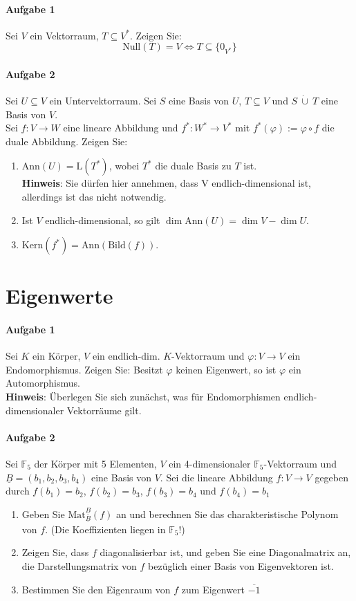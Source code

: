 \documentclass{scrartcl}
\begin{document}
	\paragraph{Aufgabe 1}
	Sei $V$ ein Vektorraum, $T\subseteq V^*$. Zeigen Sie:
	\[\text{Null}(T)=V\Leftrightarrow T\subseteq\{0_{V^*}\}\]
	\paragraph{Aufgabe 2}
	Sei $U\subseteq V$ ein Untervektorraum. Sei $S$ eine Basis von $U$, $T\subseteq V$ und $S\ \dot\cup\ T$ eine Basis von $V$.\\
	Sei $f: V\to W$ eine lineare Abbildung und $f^*: W^*\to V^*$
	mit $f^*(\varphi):=\varphi\circ f$ die duale Abbildung. Zeigen Sie:
	\begin{enumerate}[label=(\alph*)]
		\item $\text{Ann}(U)=\text{L}(T^*)$, wobei $T^*$ die duale Basis zu $T$ ist.\\
		\textbf{Hinweis}: Sie dürfen hier annehmen, dass V endlich-dimensional ist,
		allerdings ist das nicht notwendig.
		\item Ist $V$ endlich-dimensional, so gilt $\dim \text{Ann}(U)=\dim V-\dim U$.
		\item $\text{Kern}(f^*)=\text{Ann}(\text{Bild}(f))$.
	\end{enumerate}
	\section{Eigenwerte}
	\paragraph{Aufgabe 1}
	Sei $K$ ein Körper, $V$ ein endlich-dim. $K$-Vektorraum und $\varphi:V\to V$ ein Endomorphismus.
	Zeigen Sie: Besitzt $\varphi$ keinen Eigenwert, so ist $\varphi$ ein Automorphismus.\\
	\textbf{Hinweis}: Überlegen Sie sich zunächst,
	was für Endomorphismen endlich-dimensionaler Vektorräume gilt.
	\paragraph{Aufgabe 2}
	Sei $\mathbb{F}_5$ der Körper mit 5 Elementen,
	$V$ ein 4-dimensionaler $\mathbb{F}_5$-Vektorraum
	und $\underline{B}=(b_1,b_2,b_3,b_4)$ eine Basis von $V$.
	Sei die lineare Abbildung $f: V\to V$ gegeben
	durch $f(b_1)=b_2$, $f(b_2)=b_3$, $f(b_3)=b_4$ und $f(b_4)=b_1$
	\begin{enumerate}[label=(\alph*)]
		\item Geben Sie $\text{Mat}_{\underline{B}}^{\underline{B}}(f)$ an
			und berechnen Sie das charakteristische Polynom von $f$.
			(Die Koeffizienten liegen in $\mathbb{F}_5$!)
		\item Zeigen Sie, dass $f$ diagonalisierbar ist,
			und geben Sie eine Diagonalmatrix an, die Darstellungsmatrix von $f$
			bezüglich einer Basis von Eigenvektoren ist.
		\item Bestimmen Sie den Eigenraum von $f$ zum Eigenwert $\overline{-1}$
	\end{enumerate}
\end{document}
